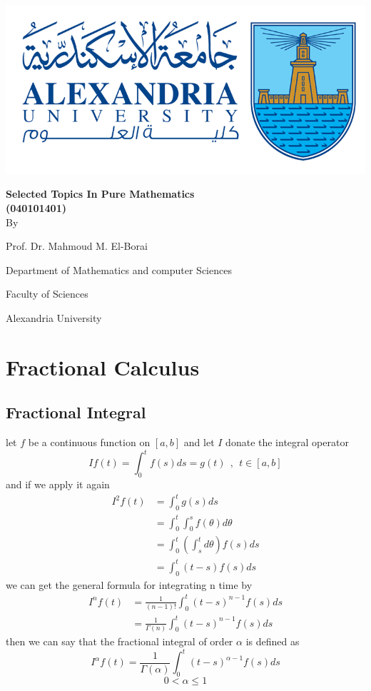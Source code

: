 \documentclass[]{article}
\begin{document}
\newpage
\setcounter{page}{1}
\begingroup
{}
\begin{center}
    \includegraphics[scale=.5]{collage logo.png}
    \vspace*{1.5cm}
    \par
    {\fontsize{20pt}{30pt}\selectfont
    \textbf{Selected Topics In Pure Mathematics\\(040101401)}
    \\
    \vspace*{.75cm}
    By
    \vspace*{.75cm}
    
    Prof. Dr. Mahmoud M. El-Borai
    
    Department of Mathematics and computer Sciences
    
    Faculty of Sciences
    
    Alexandria University
    }
\end{center}
\restoregeometry
\endgroup
\newpage
\tableofcontents
\newpage



\section{Fractional Calculus}
\subsection{Fractional Integral}
let $f$ be a continuous function on $[a,b]$ and let $I$ donate the integral operator 
\[
If(t) = \int_{0}^{t}f(s)ds = g(t) \ \ , \ \ t\in[a,b]
\]
and if we apply it again 
\begin{align*}
    I^{2}f(t)  &= \int_{0}^{t}g(s)ds \\
            &= \int_{0}^{t}\int_{0}^{s}f(\theta)d\theta\\
            &= \int_{0}^{t} \left(\int_{s}^{t}d\theta\right)f(s)ds\\
            &= \int_{0}^{t} (t-s) f(s) ds
\end{align*}
we can get the general formula for integrating n time by 
\begin{align*}
    I^{n}f(t) &= \frac{1}{(n-1)!}\int_{0}^{t}(t-s)^{n-1}f(s)ds\\
            &=\frac{1}{\Gamma(n)}\int_{0}^{t}(t-s)^{n-1}f(s)ds
\end{align*}
then we can say that the fractional integral of order $\alpha$ is defined as 
\begin{equation}
    I^{\alpha}f(t) =\frac{1}{\Gamma(\alpha)}\int_{0}^{t}(t-s)^{\alpha-1}f(s)ds
\end{equation}
\[
    0<\alpha\leq 1    
\]
\end{document}

